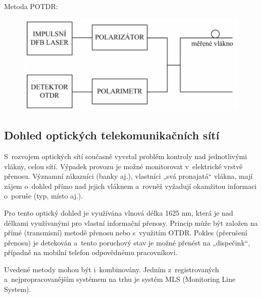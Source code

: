 Metoda POTDR:
\begin{figure}[!ht]
  \begin{center}
    \includegraphics[scale=1]{obrazky/merPMD3.png}
  \end{center}
\end{figure}

\subsection{Dohled optických telekomunikačních sítí}
S~rozvojem optických sítí současně vyvstal problém kontroly nad jednotlivými vlákny, celou sítí. Výpadek provozu je možné monitorovat v~elektrické vrstvě přenosu. Významní zákazníci (banky aj.), vlastníci „svá pronajatá“ vlákna, mají zájem o~dohled přímo nad jejich vláknem a~rovněž vyžadují okamžitou informaci o~poruše (typ, místo aj.).

Pro tento optický dohled je využívána vlnová délka 1625 nm, která je nad délkami využívanými pro vlastní informační přenosy. Princip může být založen na přímé (transmisní) metodě přenosu nebo s~využitím OTDR. Pokles (přerušení přenosu) je detekován a~tento poruchový stav je možné přenést na „dispečink“, případně na mobilní telefon odpovědnému pracovníkovi.

Uvedené metody mohou být i~kombinovány. Jedním z~registrovaných a~nejpropracovanějším systémem na trhu je systém MLS (Monitoring Line System).
